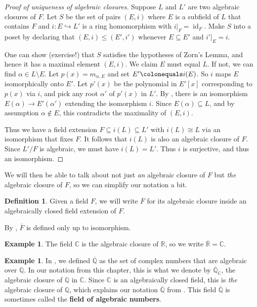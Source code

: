 \documentclass[12pt]{report}
\numberwithin{equation}{section}
\numberwithin{theorem}{chapter}
\theoremstyle{definition}
\newtheorem{definition}[theorem]{Definition}
\newtheorem{example}[theorem]{Example}
\newtheorem*{basic properties}{Basic Properties}
\newtheorem*{Important Remark}{Important Remark}
\newcommand{\df}[1]{{\bf #1}\index{#1}}
\newcommand{\R}{\mathbb{R}}
\newcommand{\Q}{\mathbb{Q}}
\newcommand{\C}{\mathbb{C}}
\DeclareMathOperator{\id}{id}
\begin{document}
\begin{proof}[Proof of uniqueness of algebraic closures]
Suppose $L$ and $L'$ are two algebraic closures of $F$.
Let $S$ be the set of pairs $(E,i)$ where $E$ is a subfield of $L$ that contains $F$ and $i: E \hookrightarrow L'$ is a ring homomorphism with $i|_F = \id_F$. Make $S$ into a poset by declaring that $(E,i) \leq (E',i')$ whenever $E \subseteq E'$ and $i'|_E = i$.

One can show (exercise!) that $S$ satisfies the hypotheses of Zorn's Lemma, and hence it has a maximal element $(E,i)$. We claim $E$ must equal $L$. If not, we can find $\alpha \in L \setminus E$. Let $p(x) = m_{\alpha, E}$ and set $E' \colonequals i(E)$. So $i$ maps $E$ isomorphically onto $E'$.
Let $p'(x)$ be the polynomial in $E'[x]$ corresponding to $p(x)$ via $i$, and pick any root $\alpha'$ of $p'(x)$ in $L'$.
By , there is an isomorphism $E(\alpha) \to E'(\alpha')$
extending the isomorphism $i$. Since $E(\alpha) \subseteq L$, and by assumption $\alpha \notin E$, this contradicts the maximality of $(E, i)$.

Thus we have a field extension $F \subseteq i(L) \subseteq L'$ with $i(L) \cong L$ via an isomorphism that fixes $F$. It follows that $i(L)$ is also an algebraic closure of $F$. Since $L'/F$ is algebraic, we must have $i(L) = L'$. Thus $i$ is surjective, and thus an isomorphism.
\end{proof}


We will then be able to talk about not just \emph{an} algebraic closure of $F$ but \emph{the} algebraic closure of $F$, so we can simplify our notation a bit.


\begin{definition}
	Given a field $F$, we will write $\overline{F}$ for its algebraic closure inside an algebraically closed field extension of $F$.
\end{definition}


By , $\overline{F}$ is defined only up to isomorphism.


\begin{example}
	The field $\C$ is the algebraic closure of $\R$, so we write $\overline{\R} = \C$.
\end{example}


\begin{example}
	In , we defined $\overline{\Q}$ as the set of complex numbers that are algebraic over $\Q$. In our notation from this chapter, this is what we denote by $\overline{\Q}_\C$, the algebraic closure of $\Q$ in $\C$. Since $\C$ is an algebraically closed field, this is \emph{the} algebraic closure of $\Q$, which explains our notation $\overline{\Q}$ from . This field $\overline{\Q}$ is sometimes called the \df{field of algebraic numbers}.
\end{example}
\end{document}
